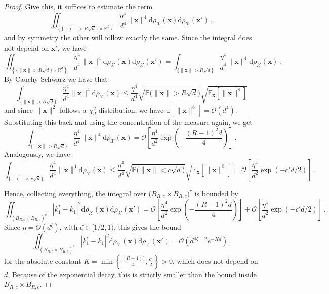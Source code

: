 \begin{proof}
    Give this, it suffices to estimate the term
    \[
        \iint_{\left\{\{\|\bm x\| > R \sqrt d\} \times \mathbb R^d\right\}}\frac{\eta^4}{d^4}\|\bm x\|^4\mathrm d\rho_{\mathcal X}(\bm x) \mathrm d\rho_{\mathcal X}(\bm x')\, ,
    \]
    and by symmetry the other will follow exactly the same.
    Since the integral does not depend on $\bm x'$, we have
    \[
        \iint_{\left\{\{\|\bm x\| > R \sqrt d\} \times \mathbb R^d\right\}}\frac{\eta^4}{d^4}\|\bm x\|^4\mathrm d\rho_{\mathcal X}(\bm x) \mathrm d\rho_{\mathcal X}(\bm x') = \int_{\{\|\bm x\| > R \sqrt d\}}\frac{\eta^4}{d^4}\|\bm x\|^4\mathrm d\rho_{\mathcal X}(\bm x) \, .
    \]
    By Cauchy Schwarz we have that
    \[
        \int_{\{\|\bm x\| > R \sqrt d\}}\frac{\eta^4}{d^4}\|\bm x\|^4\mathrm d\rho_{\mathcal X}(\bm x)  \leq \frac{\eta^4}{d^4} \sqrt{\mathbb P \Big(\|\bm x\| > R\sqrt d\Big)} \sqrt{\mathbb E_{\bm x}[\|\bm x\|^8]}
    \]
    and since $\|\bm{x}\|^2$ follows a $\chi^2_d$ distribution, we have $\mathbb{E}[\|\bm {x}\|^8] = \mathcal O(d^4)$. Substituting this back and using the concentration of the measure again, we get
    \[
        \int_{\{\|\bm x\| > R \sqrt d\}}\frac{\eta^4}{d^4}\|\bm x\|^4\mathrm d\rho_{\mathcal X}(\bm x) = \mathcal O\left[\frac{\eta^4}{d^2}\exp\left(-\frac{(R-1)^2 d}{4}\right)\right] \, .
    \]
    Analogously, we have
    \[
        \int_{\{\|\bm x\| < c \sqrt d\}}\frac{\eta^4}{d^4}\|\bm x\|^4\mathrm d\rho_{\mathcal X}(\bm x) \leq \frac{\eta^4}{d^4}\sqrt{\mathbb P \Big(\|\bm x\| < c\sqrt d\Big)}\sqrt{\mathbb E_{\bm x}[\|\bm x\|^8]} = \mathcal O\left[\frac{\eta^4}{d^2}\exp(-c'd/2)\right] \, .
    \]
    
    Hence, collecting everything, the integral over $\Big( B_{R, c} \times B_{R, c} \Big)^c$ is bounded by
    \[
        \iint_{(B_{R, c}\times B_{R, c})^c}|k_1^* - k_1|^2 \mathrm d \rho_{\mathcal X}(\bm x)\mathrm d \rho_{\mathcal X}(\bm x') =  \mathcal O\left[\frac{\eta^4}{d^2} \exp \left( -\frac{(R-1)^2d}{4}\right) \right] + \mathcal O\left[\frac{\eta^4}{d^2}\exp(-c'd/2)\right] \, .
    \]
    Since $\eta = \Theta(d^\zeta)$, with $\zeta \in [1/2, 1)$, this gives the bound
    \[
        \iint_{(B_{R, c}\times B_{R, c})^c}|k_1^* - k_1|^2 \mathrm d \rho_{\mathcal X}(\bm x)\mathrm d \rho_{\mathcal X}(\bm x') = \mathcal O\left(d^{4\zeta-2}e^{-K d} \right)\, .
    \]
    for the absolute constant $K = \min \left\{\frac{(R-1)^2}{4}, \frac{c'}{2}\right\} > 0$, which does not depend on $d$. Because of the exponential decay, this is strictly smaller than the bound inside $B_{R, c}\times B_{R, c}$.

\end{proof}
